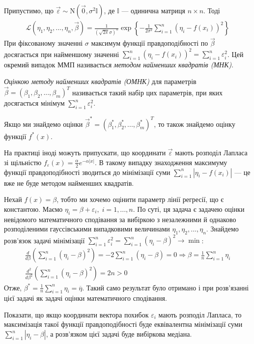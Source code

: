 Припустимо, що $\vec{\varepsilon} \sim \mathrm{N}(\vec{0}, \sigma^2 \mathbb{I})$, де
$\mathbb{I}$ --- одинична матриця $n\times n$. Тоді
\begin{gather*}
    \mathcal{L}\left(\eta_1, \eta_2, ..., \eta_n, \vec{\beta}\right) = 
    \frac{1}{\left(\sqrt{2\pi} \sigma\right)^n} \exp\left\{
        -\frac{1}{2\sigma^2} \sum_{i=1}^n (\eta_i - f(x_i))^2
        \right\}
\end{gather*}
При фіксованому значенні $\sigma$ максимум функції правдоподібності по $\vec{\beta}$ досягається
при найменшому значенні $\sum\limits_{i=1}^n (\eta_i - f(x_i))^2 = \sum\limits_{i=1}^n \varepsilon_i^2$.
Цей окремий випадок ММП називається \emph{методом найменших квадратів (МНК)}.
\begin{definition}
    \emph{Оцінкою методу найменших квадратів (ОМНК)} для параметрів $\vec{\beta} = (\beta_1, \beta_2, ..., \beta_m)^T$
    називається такий набір цих параметрів, при яких досягається мінімум $\sum\limits_{i=1}^n \varepsilon_i^2$.
\end{definition}
Якщо ми знайдемо оцінки $\vec{\beta}^* = (\beta_1^*, \beta_2^*, ..., \beta_m^*)^T$,
то також знайдемо оцінку функції $f^*(x)$.
\begin{remark}
    На практиці іноді можуть припускати, що координати $\vec{\varepsilon}$ мають 
    розподіл Лапласа зі щільністю $f_\varepsilon(x) = \frac{\alpha}{2} e^{-\alpha|x|}$.
    В такому випадку знаходження максимуму функції правдоподібності зводиться
    до мінімізації суми $\sum\limits_{i=1}^n |\eta_i - f(x_i)|$ --- це вже не буде
    методом найменших квадратів.
\end{remark}
\begin{example}\label{intercept_fit}
    Нехай $f(x) = \beta$, тобто ми хочемо оцінити параметр лінії регресії, що є константою.
    Маємо $\eta_i = \beta + \varepsilon_i, \; i = 1,...,n$. По суті, ця задача є задачею оцінки невідомого математичного сподівання
    за вибіркою з незалежними й однаково розподіленими гауссівськими випадковими величинами
    $\eta_1, \eta_2, ..., \eta_n$. Знайдемо розв'язок задачі мінімізації
    $\sum\limits_{i=1}^n \varepsilon_i^2 = \sum\limits_{i=1}^n (\eta_i - \beta)^2 \to \min$:
    \begin{gather*}
        \frac{d}{d\beta} \left(\sum\limits_{i=1}^n (\eta_i - \beta)^2\right) = 
        - 2 \sum\limits_{i=1}^n (\eta_i - \beta) = 0 \Rightarrow \beta = \frac{1}{n} \sum\limits_{i=1}^n \eta_i \\
        \frac{d^2}{d\beta^2} \left(\sum\limits_{i=1}^n (\eta_i - \beta)^2\right) = 2n > 0
    \end{gather*}
    Отже, $\beta^* = \frac{1}{n}\sum\limits_{i=1}^n \eta_i = \overline{\eta}$. Такий само результат було
    отримано і при розв'язанні цієї задачі як задачі оцінки математичного сподівання.
\end{example}
\begin{exercise}
    Показати, що якщо координати вектора похибок $\varepsilon_i$ мають розподіл Лапласа, то максимізація
    такої функції правдоподібності буде еквівалентна мінімізації суми
    $\sum\limits_{i=1}^n |\eta_i - \beta|$, а розв'язком цієї задачі буде вибіркова медіана.
\end{exercise}

